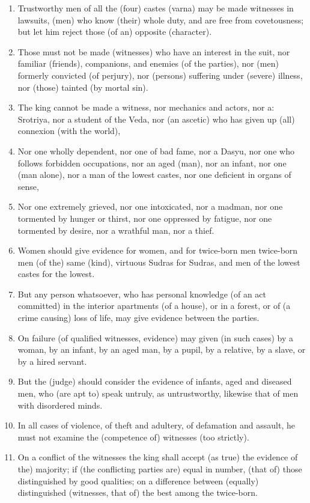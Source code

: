 \begin{enumerate}
\item Trustworthy men of all the (four) castes (varna) may be made witnesses in lawsuits, (men) who know (their) whole duty, and are free from covetousness; but let him reject those (of an) opposite (character).
\item Those must not be made (witnesses) who have an interest in the suit, nor familiar (friends), companions, and enemies (of the parties), nor (men) formerly convicted (of perjury), nor (persons) suffering under (severe) illness, nor (those) tainted (by mortal sin).
\item The king cannot be made a witness, nor mechanics and actors, nor a: Srotriya, nor a student of the Veda, nor (an ascetic) who has given up (all) connexion (with the world),
\item Nor one wholly dependent, nor one of bad fame, nor a Dasyu, nor one who follows forbidden occupations, nor an aged (man), nor an infant, nor one (man alone), nor a man of the lowest castes, nor one deficient in organs of sense,
\item Nor one extremely grieved, nor one intoxicated, nor a madman, nor one tormented by hunger or thirst, nor one oppressed by fatigue, nor one tormented by desire, nor a wrathful man, nor a thief.
\item Women should give evidence for women, and for twice-born men twice-born men (of the) same (kind), virtuous Sudras for Sudras, and men of the lowest castes for the lowest.
\item But any person whatsoever, who has personal knowledge (of an act committed) in the interior apartments (of a house), or in a forest, or of (a crime causing) loss of life, may give evidence between the parties.
\item On failure (of qualified witnesses, evidence) may given (in such cases) by a woman, by an infant, by an aged man, by a pupil, by a relative, by a slave, or by a hired servant.
\item But the (judge) should consider the evidence of infants, aged and diseased men, who (are apt to) speak untruly, as untrustworthy, likewise that of men with disordered minds.
\item In all cases of violence, of theft and adultery, of defamation and assault, he must not examine the (competence of) witnesses (too strictly).
\item On a conflict of the witnesses the king shall accept (as true) the evidence of the) majority; if (the conflicting parties are) equal in number, (that of) those distinguished by good qualities; on a difference between (equally) distinguished (witnesses, that of) the best among the twice-born.

\end{enumerate}
